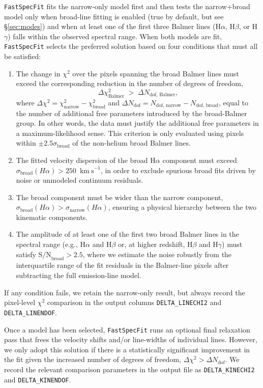 \documentclass[modern,linenumbers]{aastex701}
\newcommand{\fastspecfit}{\texttt{FastSpecFit}}
\newcommand{\kms}{\ensuremath{\mathrm{km~s}^{-1}}}
\newcommand{\ha}{H\ensuremath{\alpha}}
\newcommand{\hb}{H\ensuremath{\beta}}
\newcommand{\hg}{H\ensuremath{\gamma}}
\begin{document}
\fastspecfit{} fits the narrow-only model first and then tests the
narrow+broad model only when broad-line fitting is enabled (true by
default, but see \S\ref{sec:modes}) and when at least one of the first
three Balmer lines (\ha, \hb, or \hg) falls within the observed
spectral range. When both models are fit, \fastspecfit{} selects the
preferred solution based on four conditions that must all be
satisfied:
\begin{enumerate}

\item{The change in $\chi^2$ over the pixels spanning the broad Balmer
  lines must exceed the corresponding reduction in the number of
  degrees of freedom,
\begin{equation}
  \Delta\chi^2_\mathrm{Balmer} \;>\; \Delta N_\mathrm{dof,\,Balmer},
  \label{eq:broadchi2}
\end{equation}
where $\Delta\chi^2 = \chi^2_\mathrm{narrow} - \chi^2_\mathrm{broad}$
and $\Delta N_\mathrm{dof} = N_\mathrm{dof,\,narrow} -
N_\mathrm{dof,\,broad}$, equal to the number of additional free
parameters introduced by the broad-Balmer group. In other words, the
data must justify the additional free parameters in a
maximum-likelihood sense. This criterion is only evaluated using
pixels within $\pm 2.5\sigma_\mathrm{broad}$ of the non-helium broad
Balmer lines.}
\item{The fitted velocity dispersion of the broad \ha{} component must
  exceed $\sigma_\mathrm{broad}(\ha) > 250$~\kms, in order to exclude
  spurious broad fits driven by noise or unmodeled continuum
  residuals.}
\item{The broad component must be wider than the narrow component,
  $\sigma_\mathrm{broad}(\ha) > \sigma_\mathrm{narrow}(\ha)$, ensuring
  a physical hierarchy between the two kinematic components.}
\item{The amplitude of at least one of the first two broad Balmer
  lines in the spectral range (e.g., \ha{} and \hb{} or, at higher
  redshift, \hb{} and \hg) must satisfy $\mathrm{S/N}_\mathrm{broad} >
  2.5$, where we estimate the noise robustly from the interquartile
  range of the fit residuals in the Balmer-line pixels after
  subtracting the full emission-line model.}
\end{enumerate}
If any condition fails, we retain the narrow-only result, but always
record the pixel-level $\chi^2$ comparison in the output columns
\texttt{DELTA\_LINECHI2} and \texttt{DELTA\_LINENDOF}.

Once a model has been selected, \fastspecfit{} runs an optional final
relaxation pass that frees the velocity shifts and/or line-widths of
individual lines. However, we only adopt this solution if there is a
statistically significant improvement in the fit given the increased
number of degrees of freedom, $\Delta\chi^2 > \Delta
N_\mathrm{dof}$. We record the relevant comparison parameters in the
output file as \texttt{DELTA\_KINECHI2} and \texttt{DELTA\_KINENDOF}.
\end{document}
